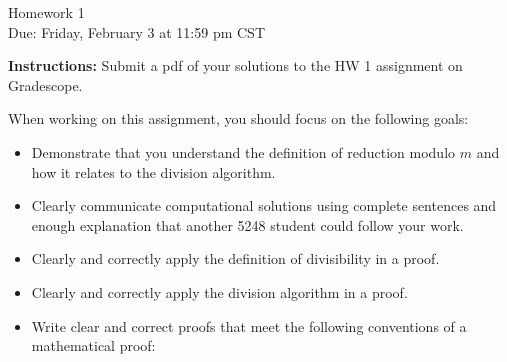 \documentclass[12pt]{article}
\begin{document}
\begin{center}
{\Large Homework 1}\\
Due: Friday,  February 3 at 11:59 pm CST\\


\end{center}
{\bf Instructions:} Submit a pdf of your solutions to the HW 1 assignment on Gradescope. 

When working on this assignment, you should focus on the following goals:
\begin{itemize}
\item Demonstrate that you understand the definition of reduction modulo $m$ and how it relates to the division algorithm. 
\item Clearly communicate computational solutions using complete sentences and enough explanation that another 5248 student could follow your work.
\item Clearly and correctly apply the definition of divisibility in a proof. 
\item Clearly and correctly apply the division algorithm in a proof.
\item Write clear and correct proofs that meet the following conventions of a mathematical proof:
\end{itemize}
\end{document}
